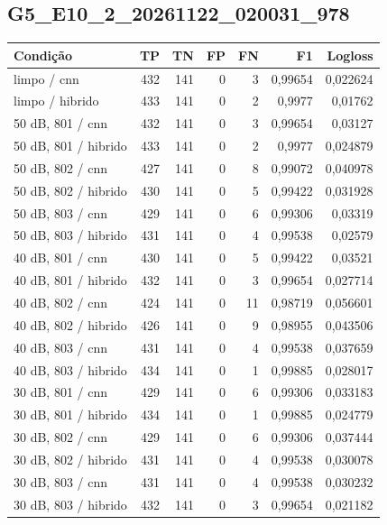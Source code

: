 \subsection{G5\_E10\_2\_20261122\_020031\_978}
\small\begin{longtable}{@{}p{.38\linewidth}rrrrrr@{}}
\toprule Condição & TP & TN & FP & FN & F1 & Logloss\\\midrule\endhead
limpo /\allowbreak{} cnn & 432 & 141 & 0 & 3 & 0,99654 & 0,022624\\
limpo /\allowbreak{} hibrido & 433 & 141 & 0 & 2 & 0,9977 & 0,01762\\
50 dB, 801 /\allowbreak{} cnn & 432 & 141 & 0 & 3 & 0,99654 & 0,03127\\
50 dB, 801 /\allowbreak{} hibrido & 433 & 141 & 0 & 2 & 0,9977 & 0,024879\\
50 dB, 802 /\allowbreak{} cnn & 427 & 141 & 0 & 8 & 0,99072 & 0,040978\\
50 dB, 802 /\allowbreak{} hibrido & 430 & 141 & 0 & 5 & 0,99422 & 0,031928\\
50 dB, 803 /\allowbreak{} cnn & 429 & 141 & 0 & 6 & 0,99306 & 0,03319\\
50 dB, 803 /\allowbreak{} hibrido & 431 & 141 & 0 & 4 & 0,99538 & 0,02579\\
40 dB, 801 /\allowbreak{} cnn & 430 & 141 & 0 & 5 & 0,99422 & 0,03521\\
40 dB, 801 /\allowbreak{} hibrido & 432 & 141 & 0 & 3 & 0,99654 & 0,027714\\
40 dB, 802 /\allowbreak{} cnn & 424 & 141 & 0 & 11 & 0,98719 & 0,056601\\
40 dB, 802 /\allowbreak{} hibrido & 426 & 141 & 0 & 9 & 0,98955 & 0,043506\\
40 dB, 803 /\allowbreak{} cnn & 431 & 141 & 0 & 4 & 0,99538 & 0,037659\\
40 dB, 803 /\allowbreak{} hibrido & 434 & 141 & 0 & 1 & 0,99885 & 0,028017\\
30 dB, 801 /\allowbreak{} cnn & 429 & 141 & 0 & 6 & 0,99306 & 0,033183\\
30 dB, 801 /\allowbreak{} hibrido & 434 & 141 & 0 & 1 & 0,99885 & 0,024779\\
30 dB, 802 /\allowbreak{} cnn & 429 & 141 & 0 & 6 & 0,99306 & 0,037444\\
30 dB, 802 /\allowbreak{} hibrido & 431 & 141 & 0 & 4 & 0,99538 & 0,030078\\
30 dB, 803 /\allowbreak{} cnn & 431 & 141 & 0 & 4 & 0,99538 & 0,030232\\
30 dB, 803 /\allowbreak{} hibrido & 432 & 141 & 0 & 3 & 0,99654 & 0,021182\\

\end{longtable}
